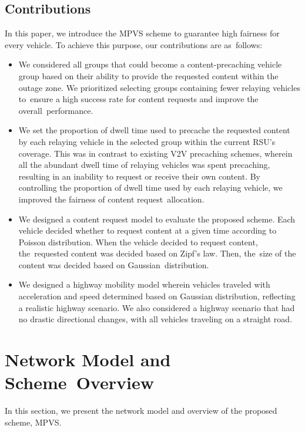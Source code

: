 \documentclass[sensors,aricle,accept,pdftex,moreauthors]{Definitions/mdpi}
\begin{document}
\subsection{Contributions}
In this paper, we introduce the MPVS scheme to guarantee high fairness for every vehicle.
To achieve this purpose, our contributions are as~follows:
\begin{itemize}
\item We considered all groups that could become a content-precaching vehicle group based on their ability to provide the requested content within the outage zone.
We prioritized selecting groups containing fewer relaying vehicles to~ensure a high success rate for content requests and improve the overall~performance.

\item We set the proportion of dwell time used to precache the requested content by each relaying vehicle in the selected group within the current RSU's coverage.
This was in contrast to existing V2V precaching schemes, wherein all the abundant dwell time of relaying vehicles was spent precaching, 
resulting in an inability to request or receive their own content.
By controlling the proportion of dwell time used by each relaying vehicle, we improved the fairness of content request~allocation.

\item We designed a content request model to evaluate the proposed scheme. 
Each vehicle decided whether to request content at a given time according to Poisson distribution.
When the vehicle decided to request content, the~requested content was decided based on Zipf's law.
Then, the~size of the content was decided based on Gaussian~distribution.

\item We designed a highway mobility model wherein vehicles traveled with acceleration and speed determined based on Gaussian distribution, reflecting a realistic highway scenario.
We also considered a highway scenario that had no drastic directional changes, with all vehicles traveling on a straight road.
\end{itemize}

\section{Network Model and Scheme~Overview} \label{sec3}
In this section, we present the network model and overview of the proposed scheme, MPVS.
\end{document}
